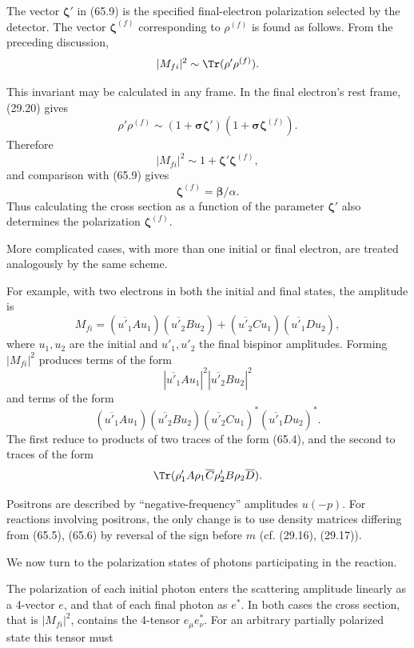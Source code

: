 The vector $\boldsymbol\zeta'$ in (65.9) is the specified final-electron polarization selected by the detector. The vector $\boldsymbol\zeta^{(f)}$ corresponding to $\rho^{(f)}$ is found as follows. From the preceding discussion,
\[
|M_{fi}|^2\sim\Tr(\rho'\rho^{(f)}).
\]

This invariant may be calculated in any frame. In the final electron's rest frame, (29.20) gives
\[
\rho'\rho^{(f)}\sim(1+\boldsymbol\sigma\boldsymbol\zeta')(1+\boldsymbol\sigma\boldsymbol\zeta^{(f)}).
\]
Therefore
\[
|M_{fi}|^2\sim1+\boldsymbol\zeta'\boldsymbol\zeta^{(f)},
\]
and comparison with (65.9) gives
\begin{equation}
\boldsymbol\zeta^{(f)}=\boldsymbol\beta/\alpha.
\tag{65.10}
\end{equation}
Thus calculating the cross section as a function of the parameter $\boldsymbol\zeta'$ also determines the polarization $\boldsymbol\zeta^{(f)}$.

More complicated cases, with more than one initial or final electron, are treated analogously by the same scheme.

For example, with two electrons in both the initial and final states, the amplitude is
\[
M_{fi}=(\overline{u'_1}Au_1)(\overline{u'_2}Bu_2)+(\overline{u'_2}Cu_1)(\overline{u'_1}Du_2),
\]
where $u_1,u_2$ are the initial and $u'_1,u'_2$ the final bispinor amplitudes. Forming $|M_{fi}|^2$ produces terms of the form
\[
|\overline{u'_1}Au_1|^2|\overline{u'_2}Bu_2|^2
\]
and terms of the form
\[
(\overline{u'_1}Au_1)(\overline{u'_2}Bu_2)(\overline{u'_2}Cu_1)^*(\overline{u'_1}Du_2)^*.
\]
The first reduce to products of two traces of the form (65.4), and the second to traces of the form
\[
\Tr(\rho'_1A\rho_1\overline C\rho'_2B\rho_2\overline D).
\]

Positrons are described by ``negative-frequency'' amplitudes $u(-p)$. For reactions involving positrons, the only change is to use density matrices differing from (65.5), (65.6) by reversal of the sign before $m$ (cf. (29.16), (29.17)).

We now turn to the polarization states of photons participating in the reaction.

The polarization of each initial photon enters the scattering amplitude linearly as a 4-vector $e$, and that of each final photon as $e^*$. In both cases the cross section, that is $|M_{fi}|^2$, contains the 4-tensor $e_\mu e_\nu^*$. For an arbitrary partially polarized state this tensor must

